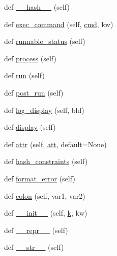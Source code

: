 \begin{DoxyCompactItemize}
\item 
def \hyperlink{classwaflib_1_1_task_1_1_task_base_a5e02f89716bcd37b2490adc0861c4bdd}{\+\_\+\+\_\+hash\+\_\+\+\_\+} (self)
\item 
def \hyperlink{classwaflib_1_1_task_1_1_task_base_a6326ff82d67a2b629c8d78b95cb8fec6}{exec\+\_\+command} (self, \hyperlink{sndfile__play_8m_adfc5ba7e22f5e4a6221c12a70503bef3}{cmd}, kw)
\item 
def \hyperlink{classwaflib_1_1_task_1_1_task_base_a10c4597d9085bd1680f9b3eb28e23899}{runnable\+\_\+status} (self)
\item 
def \hyperlink{classwaflib_1_1_task_1_1_task_base_ae5e951a187c8d09c31960bbcf76fad25}{process} (self)
\item 
def \hyperlink{classwaflib_1_1_task_1_1_task_base_ae549bc1a80fd94cc94fd1e764c76895c}{run} (self)
\item 
def \hyperlink{classwaflib_1_1_task_1_1_task_base_a21b09d3f18df76e1d8b0719f321ea3bd}{post\+\_\+run} (self)
\item 
def \hyperlink{classwaflib_1_1_task_1_1_task_base_adf380fd031fc987f4dcd54e1f70420a7}{log\+\_\+display} (self, bld)
\item 
def \hyperlink{classwaflib_1_1_task_1_1_task_base_a838316cf55ac50fab2ae0e8771917e74}{display} (self)
\item 
def \hyperlink{classwaflib_1_1_task_1_1_task_base_a8ead2ec09545f4e9e27d6b40f9f80eaa}{attr} (self, \hyperlink{filters_8h_a6cbe32dd86cefd1a8b182b3ee652e9bf}{att}, default=None)
\item 
def \hyperlink{classwaflib_1_1_task_1_1_task_base_ad4f2583a59ff62565735490154826033}{hash\+\_\+constraints} (self)
\item 
def \hyperlink{classwaflib_1_1_task_1_1_task_base_a321e667402035aa56626ee6f7b3b8223}{format\+\_\+error} (self)
\item 
def \hyperlink{classwaflib_1_1_task_1_1_task_base_ae9648ec691e059291a79f38ef6ee12cc}{colon} (self, var1, var2)
\item 
def \hyperlink{classwaflib_1_1_task_1_1_task_base_add6ae927b00bd1f14d5b87738dd53e70}{\+\_\+\+\_\+init\+\_\+\+\_\+} (self, \hyperlink{rfft2d_test_m_l_8m_adc468c70fb574ebd07287b38d0d0676d}{k}, kw)
\item 
def \hyperlink{classwaflib_1_1_task_1_1_task_base_a004a67fbb5d7e36d1a6ba48390e0d5f7}{\+\_\+\+\_\+repr\+\_\+\+\_\+} (self)
\item 
def \hyperlink{classwaflib_1_1_task_1_1_task_base_a07123f80c95b1d17a699064cd10d8885}{\+\_\+\+\_\+str\+\_\+\+\_\+} (self)
\item 

\end{DoxyCompactItemize}
